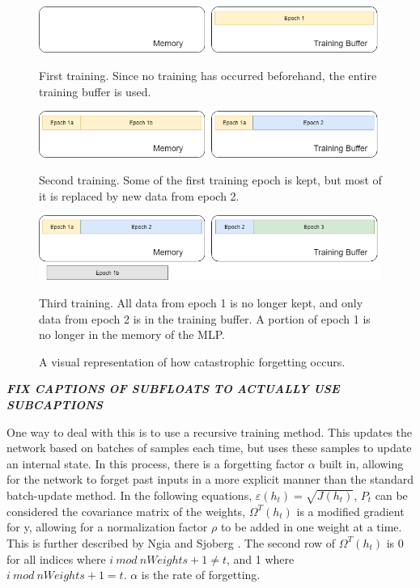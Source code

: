	\begin{figure}[ht]
		\centering
		\begin{subfloat}%
			\centering
			\includegraphics[width=\textwidth]{figures/CatastrophicForgettingA}
			\caption{First training. Since no training has occurred beforehand, the entire training buffer is used.}
		\end{subfloat}
		\begin{subfloat}
		\centering
		\includegraphics[width=\textwidth]{figures/CatastrophicForgettingB}
		\caption{Second training. Some of the first training epoch is kept, but most of it is replaced by new data from epoch 2.}
	\end{subfloat}%
	\begin{subfloat}
	\centering
	\includegraphics[width=\textwidth]{figures/CatastrophicForgettingC}
	\caption{Third training. All data from epoch 1 is no longer kept, and only data from epoch 2 is in the training buffer. A portion of epoch 1 is no longer in the memory of the MLP.}
	\end{subfloat}%
	\caption{A visual representation of how catastrophic forgetting occurs.}
	
	\end{figure}
	\par \textbf{\textit{FIX CAPTIONS OF SUBFLOATS TO ACTUALLY USE SUBCAPTIONS}}
	\par One way to deal with this is to use a recursive training method. This updates the network based on batches of samples each time, but uses these samples to update an internal state. In this process, there is a forgetting factor $\alpha$ built in, allowing for the network to forget past inputs in a more explicit manner than the standard batch-update method. In the following equations, $\varepsilon(h_t) = \sqrt{J(h_t)}$, $P_t$ can be considered the covariance matrix of the weights, $\Omega^T(h_t)$ is a modified gradient for y, allowing for a normalization factor $\rho$ to be added in one weight at a time. This is further described by Ngia and Sjoberg \cite{rlmBasis}. The second row of $\Omega^T(h_t)$ is 0 for all indices where $i\ mod\ nWeights+1 \neq t$, and 1 where $i\ mod\ nWeights+1 = t$. $\alpha$ is the rate of forgetting. 
